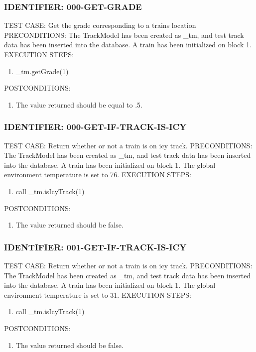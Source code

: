 \documentclass{scrreprt}
\begin{document}
\subsubsection{IDENTIFIER: 000-GET-GRADE}
TEST CASE: Get the grade corresponding to a trains location
PRECONDITIONS: The TrackModel has been created as _tm, and test track data has been inserted into the database. A train has been initialized on block 1.
EXECUTION STEPS:
\begin{enumerate}
	\item _tm.getGrade(1)
\end{enumerate}
POSTCONDITIONS:
\begin{enumerate}
	\item The value returned should be equal to .5.
\end{enumerate}

\subsubsection{IDENTIFIER: 000-GET-IF-TRACK-IS-ICY}
TEST CASE: Return whether or not a train is on icy track.
PRECONDITIONS: The TrackModel has been created as _tm, and test track data has been inserted into the database. A train has been initialized on block 1. The global environment temperature is set to 76.
EXECUTION STEPS:
\begin{enumerate}
	\item call _tm.isIcyTrack(1)
\end{enumerate}
POSTCONDITIONS:
\begin{enumerate}
	\item The value returned should be false.
\end{enumerate}

\subsubsection{IDENTIFIER: 001-GET-IF-TRACK-IS-ICY}
TEST CASE: Return whether or not a train is on icy track.
PRECONDITIONS: The TrackModel has been created as _tm, and test track data has been inserted into the database. A train has been initialized on block 1. The global environment temperature is set to 31.
EXECUTION STEPS:
\begin{enumerate}
	\item call _tm.isIcyTrack(1)
\end{enumerate}
POSTCONDITIONS:
\begin{enumerate}
	\item The value returned should be false.
\end{enumerate}
\end{document}
